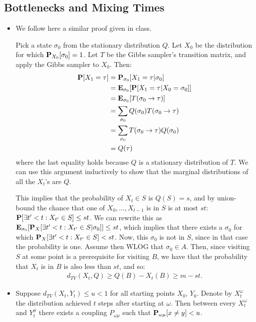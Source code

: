 \documentclass[11pt]{article} \usepackage{amssymb}
\newcommand{\E}{{\bf E}} \newcommand{\Cov}{{\bf Cov}}
\begin{document}
\subsection{Bottlenecks and Mixing Times}
\begin{itemize}
\item 
  We follow here a similar proof given in class.

  Pick a state $\sigma_0$ from the stationary distribution $Q$.
  Let $X_0$ be the distribution for which 
  $\P_{X_0}[\sigma_0]=1$. Let $T$ be the Gibbs sampler's transition matrix, 
  and apply the Gibbs sampler to $X_0$. Then:
  \begin{align*}
    \P[X_1=\tau] &= \P_{\sigma_0}[X_1=\tau|\sigma_0]
    \\ &= \E_{\sigma_0}[\P[X_1=\tau|X_0=\sigma_0]]
    \\ &= \E_{\sigma_0}[T(\sigma_0\to\tau)]
    \\ &= \sum_{\sigma_0}Q(\sigma_0)T(\sigma_0\to\tau)
    \\ &= \sum_{\sigma_0}T(\sigma_0\to\tau)Q(\sigma_0)
    \\ &= Q(\tau)
  \end{align*}
  where the last equality holds because $Q$ is a stationary distribution of $T$.
  We can use this argument inductively to show 
  that the marginal distributions of all the
  $X_t$'s are $Q$. 

  This implies that the probability of $X_t\in S$ is $Q(S)=s$,
  and by union-bound the chance that one of $X_0,\ldots,X_{t-1}$ is in $S$ is
  at most $st$: $\P[\exists t'<t:X_{t'}\in S]\leq st$. We can rewrite this as 
  $\E_{\sigma_0}[\P_X[\exists t'<t:X_{t'}\in S|\sigma_0]] \leq st$, which 
  implies that there exists a $\sigma_0$ for which 
  $\P_X[\exists t'<t:X_{t'}\in S]<st$. Now, this $\sigma_0$ is not in $S$, since in that
  case the probability is one. Assume then WLOG that $\sigma_0\in A$. Then,
  since visiting $S$ at some point is a prerequisite for visiting $B$, we have
  that the probability that $X_t$ is in $B$ is also less than $st$, and so:
  \begin{align*}
    d_{TV}(X_t,Q)\geq Q(B)-X_t(B) \geq m-st.
  \end{align*}
\item

  Suppose $d_{TV}(X_t,Y_t)\leq u < 1$ for all starting points $X_0$, $Y_0$. Denote
  by $X_t^\omega$ the distribution achieved $t$ steps after starting at 
  $\omega$. Then between every $X_t^\omega$ and $Y_t^\mu$ there exists a coupling 
  $P_{\omega\mu}$ such that $\P_{\omega\mu}[x\neq y] < u$.


\end{itemize}
\end{document}
